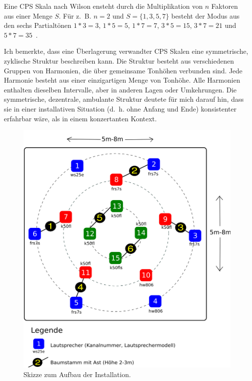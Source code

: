 \documentclass[12pt,a4paper,ngerman]{article}
\begin{document}
\smallskip

Eine CPS Skala nach Wilson ensteht durch die Multiplikation von $n$ Faktoren aus einer Menge $S$.
Für z.~B. $n=2$ und $S=\{1, 3, 5, 7\}$ besteht der Modus aus den sechs Partialtönen $1*3=3$, $1*5=5$, $1*7=7$, $3*5=15$, $3*7=21$ und $5*7=35$~\parencite[S. 150f]{ervWilsonBook}.

\smallskip

Ich bemerkte, dass eine Überlagerung verwandter CPS Skalen eine symmetrische, zyklische Struktur beschreiben kann.
Die Struktur besteht aus verschiedenen Gruppen von Harmonien, die über gemeinsame Tonhöhen verbunden sind.
Jede Harmonie besteht aus einer einzigartigen Menge von Tonhöhe.
Alle Harmonien enthalten dieselben Intervalle, aber in anderen Lagen oder Umkehrungen.
Die symmetrische, dezentrale, ambulante Struktur deutete für mich darauf hin, dass sie in einer installativen Situation (d.~h. ohne Anfang und Ende) konsistenter erfahrbar wäre, als in einem konzertanten Kontext.

\begin{figure}[h!]
        \hspace{0.5cm}
        \includegraphics[scale=0.185]{pictures/setup-thanatos-trees.png}
    \caption{%
        Skizze zum Aufbau der Installation.
    }
\end{figure}
\end{document}
